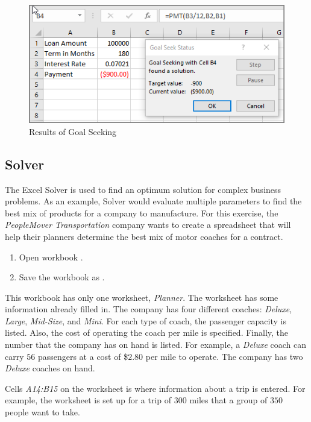 \begin{figure}[H]
	\centering
	\includegraphics[width=\maxwidth{.95\linewidth}]{gfx/ch08_fig61}
	\caption{Results of Goal Seeking}
	\label{08:fig61}
\end{figure}

\subsection{Solver}

The Excel Solver is used to find an optimum solution for complex business problems. As an example, Solver would evaluate multiple parameters to find the best mix of products for a company to manufacture. For this exercise, the \textit{PeopleMover Transportation} company wants to create a spreadsheet that will help their planners determine the best mix of motor coaches for a contract.

\begin{enumbox}
	\begin{enumerate}
		\item Open workbook .
		\item Save the workbook as .
	\end{enumerate}
\end{enumbox}

This workbook has only one worksheet, \textit{Planner}. The worksheet has some information already filled in. The company has four different coaches: \textit{Deluxe}, \textit{Large}, \textit{Mid-Size}, and \textit{Mini}. For each type of coach, the passenger capacity is listed. Also, the cost of operating the coach per mile is specified. Finally, the number that the company has on hand is listed. For example, a \textit{Deluxe} coach can carry $ 56 $ passengers at a cost of \$$ 2.80 $ per mile to operate. The company has two \textit{Deluxe} coaches on hand.

Cells \textit{A14:B15} on the worksheet is where information about a trip is entered. For example, the worksheet is set up for a trip of $ 300 $ miles that a group of $ 350 $ people want to take.

